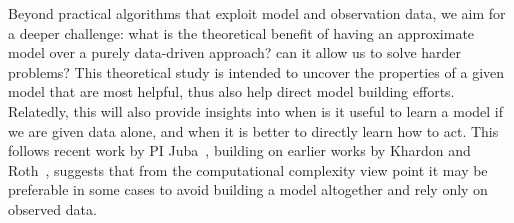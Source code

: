 \documentclass[12pt]{article}
\newcommand{\note}[1]{\textbf{\textit{#1}}}
\begin{document}
Beyond practical algorithms that exploit model and observation data, we aim for a deeper challenge: what is the theoretical benefit of having an approximate model over a purely data-driven approach? can it allow us to solve harder problems? 
This theoretical study is intended to uncover the properties of a given model that are most helpful, thus also help direct model building efforts. Relatedly, this will also provide insights into when is it useful to learn a model if we are given data alone, and when it is better to directly learn how to act. 
This follows recent work by PI Juba~\cite{juba2013ijcai,juba2015itcs}, building on earlier works by Khardon and Roth~\cite{khardon1997l2r}, suggests that from the computational complexity view point it may be preferable in some cases to avoid building a model altogether and rely only on observed data.  %
\end{document}
